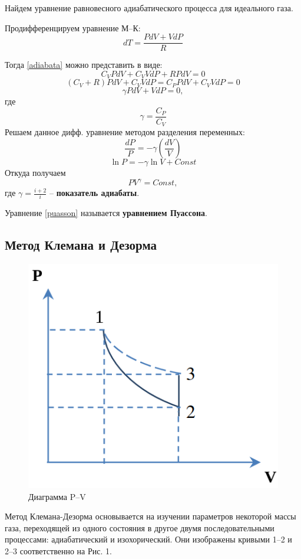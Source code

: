 \documentclass[a4paper,12pt]{article}
\begin{document}
Найдем уравнение равновесного адиабатического процесса для идеального газа.

Продифференцируем уравнение М--К:
$$dT = \frac{PdV + VdP}{R}$$

Тогда \eqref{adiabata} можно представить в виде:
$$C_VPdV + C_VVdP + RPdV = 0$$
$$(C_V+R)PdV + C_VVdP = C_PPdV + C_VVdP = 0$$
$$\gamma PdV + VdP = 0,$$
где 
$$\gamma = \frac{C_P}{C_V}$$
Решаем данное дифф. уравнение методом разделения переменных:
$$\frac{dP}{P} = -\gamma(\frac{dV}{V})$$
$$\ln P = -\gamma\ln V + Const$$
Откуда получаем
\begin{equation}\label{puasson}
PV^\gamma = Const,
\end{equation}
где $\gamma = \frac{i+2}{i}$ -- \textbf{показатель адиабаты}.

Уравнение \eqref{puasson} называется \textbf{уравнением Пуассона}.

\subsection{Метод Клемана и Дезорма}
\begin{figure}[h!]
	\begin{center}
		\includegraphics[scale=0.5]{1}
	\end{center}
	\caption{Диаграмма P--V}

\end{figure}
Метод Клемана-Дезорма основывается на изучении параметров некоторой массы газа, переходящей из одного состояния в другое двумя последовательными процессами: адиабатический и изохорический. Они изображены кривыми 1--2 и 2--3 соответственно на Рис. 1.
\end{document}
